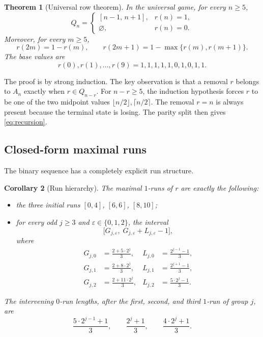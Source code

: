 \documentclass[11pt]{article}
\newtheorem{theorem}{Theorem}[section]
\newtheorem{corollary}[theorem]{Corollary}
\theoremstyle{remark}
\begin{document}
\begin{theorem}[Universal row theorem]\label{thm:universal}
In the universal game, for every \(n\ge5\),
\begin{equation}\label{eq:universal-row}
Q_n=
\begin{cases}
[n-1,\,n+1],&r(n)=1,\\
\varnothing,&r(n)=0.
\end{cases}
\end{equation}
Moreover, for every \(m\ge5\),
\begin{equation}\label{eq:recursion}
\boxed{
r(2m)=1-r(m),
\qquad
r(2m+1)=1-\max\{r(m),r(m+1)\}.
}
\end{equation}
The base values are
\[
r(0),r(1),\dots,r(9)=1,1,1,1,1,0,1,0,1,1.
\]
\end{theorem}

The proof is by strong induction. The key observation is that a removal \(r\) belongs to \(A_n\) exactly when \(r\in Q_{n-r}\). For \(n-r\ge5\), the induction hypothesis forces \(r\) to be one of the two midpoint values \(\lfloor n/2\rfloor,\lceil n/2\rceil\). The removal \(r=n\) is always present because the terminal state is losing. The parity split then gives \eqref{eq:recursion}.

\subsection{Closed-form maximal runs}

The binary sequence has a completely explicit run structure.

\begin{corollary}[Run hierarchy]\label{cor:runs}
The maximal \(1\)-runs of \(r\) are exactly the following:
\begin{itemize}
\item the three initial runs \([0,4]\), \([6,6]\), \([8,10]\);
\item for every odd \(j\ge3\) and \(\varepsilon\in\{0,1,2\}\), the interval
\[
\bigl[G_{j,\varepsilon},\;G_{j,\varepsilon}+L_{j,\varepsilon}-1\bigr],
\]
where
\begin{align}
G_{j,0}&=\frac{2+5\cdot2^j}{3},&
L_{j,0}&=\frac{2^{j-1}-1}{3},\label{eq:G0}\\
G_{j,1}&=\frac{2+8\cdot2^j}{3},&
L_{j,1}&=\frac{2^{j+1}-1}{3},\label{eq:G1}\\
G_{j,2}&=\frac{2+11\cdot2^j}{3},&
L_{j,2}&=\frac{5\cdot2^j-1}{3}.\label{eq:G2}
\end{align}
\end{itemize}
The intervening \(0\)-run lengths, after the first, second, and third \(1\)-run of group \(j\), are
\begin{equation}\label{eq:gaps}
\frac{5\cdot2^{j-1}+1}{3},
\qquad
\frac{2^j+1}{3},
\qquad
\frac{4\cdot2^j+1}{3}.
\end{equation}
\end{corollary}
\end{document}
